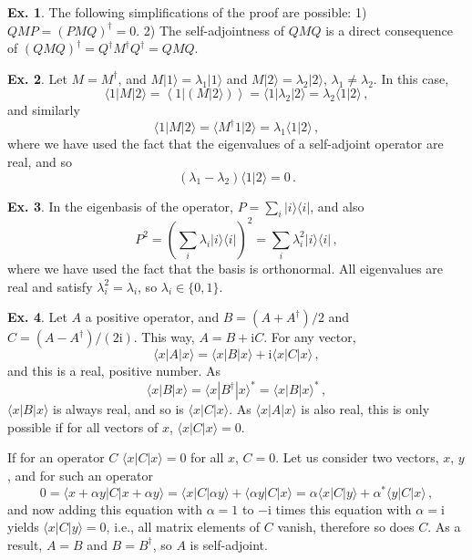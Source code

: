 \documentclass[a4paper,12pt]{article}
\def\imagi{\mathrm{i}}
\theoremstyle{definition}
\newtheorem{exercise}{Ex.}[section]
\begin{document}
\begin{exercise}
 The following simplifications of the proof are possible: 1) $QMP=(PMQ)^\dagger = 0$. 2) The self-adjointness of $QMQ$ is a direct consequence of $(QMQ)^\dagger= Q^\dagger M^\dagger Q^\dagger = QMQ$.
\end{exercise}

\begin{exercise}
Let $M=M^\dagger$, and $M|1\rangle = \lambda_1 |1\rangle$ and $M|2\rangle=\lambda_2 |2\rangle$, $\lambda_1\ne\lambda_2$. In this case,
\[
 \langle 1 | M | 2 \rangle = \left\langle 1 \left| (M |2\rangle)\right.\right\rangle = \langle 1 | \lambda_2 | 2\rangle = \lambda_2 \langle 1|2 \rangle\,,
\]
and similarly
\[
 \langle 1 | M |2\rangle = \langle M^\dagger 1 | 2\rangle = \lambda_1 \langle 1 | 2\rangle\,,
\]
where we have used the fact that the eigenvalues of a self-adjoint operator are real, and so
\[
 (\lambda_1 - \lambda_2) \langle 1 | 2\rangle = 0\,.
\]
\end{exercise}

\begin{exercise}
 In the eigenbasis of the operator, $P=\sum_i |i\rangle \langle i|$, and also
 \[
  P^2 = \left(\sum_i \lambda_i |i\rangle \langle i|\right)^2 = \sum_i \lambda_i^2 |i\rangle\langle i|\,,
 \]
 where we have used the fact that the basis is orthonormal. All eigenvalues are real and satisfy $\lambda_i^2=\lambda_i$, so $\lambda_i\in\{0,1\}$.
\end{exercise}

\begin{exercise}
 Let $A$ a positive operator, and $B=(A+A^\dagger)/2$ and $C=(A-A^\dagger)/(2\imagi)$. This way, $A=B+\imagi C$. For any vector,
 \[
  \langle x | A | x\rangle = \langle x | B | x\rangle + \imagi \langle x | C | x\rangle\,,
 \]
 and this is a real, positive number. As
 \[
  \langle x | B| x\rangle = \langle x| B^\dagger |x\rangle^* = \langle x | B |x\rangle^*\,,
 \]
 $\langle x| B|x\rangle$ is always real, and so is $\langle x | C|x\rangle$.  As $\langle x|A|x\rangle$ is also real, this is only possible if for all vectors of $x$, $\langle x|C|x\rangle =0$.

 If for an operator $C$ $\langle x|C| x\rangle = 0$ for all $x$, $C=0$. Let us consider two vectors, $x$, $y$, and for such an operator
 \[
  0=\langle x + \alpha y | C| x+\alpha y\rangle = \langle x| C|\alpha y\rangle + \langle \alpha y | C | x\rangle = \alpha \langle x | C | y \rangle + \alpha^* \langle y | C|x\rangle\,,
 \]
 and now adding this equation with $\alpha=1$ to $-\imagi$ times this equation with $\alpha=\imagi$ yields $\langle x | C|y\rangle=0$, i.e., all matrix elements of $C$ vanish, therefore so does $C$. As a result, $A=B$ and $B=B^\dagger$, so $A$ is self-adjoint.
\end{exercise}
\end{document}
